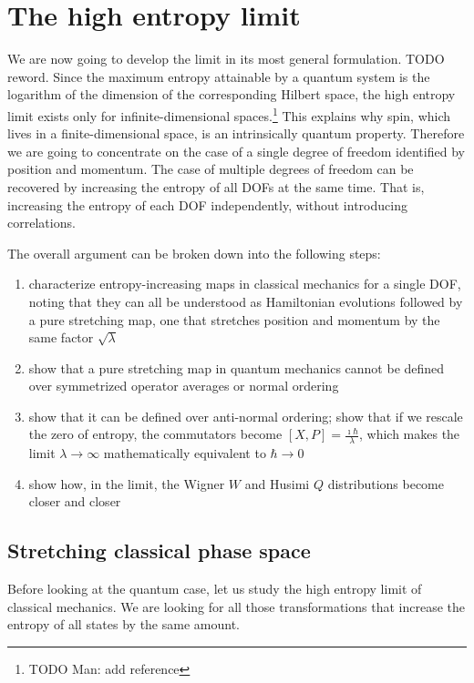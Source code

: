 \documentclass{article}
\begin{document}
\section{The high entropy limit}

We are now going to develop the limit in its most general formulation. TODO reword. Since the maximum entropy attainable by a quantum system is the logarithm of the dimension of the corresponding Hilbert space, the high entropy limit exists only for infinite-dimensional spaces.\footnote{TODO Man: add reference} This explains why spin, which lives in a finite-dimensional space, is an intrinsically quantum property. Therefore we are going to concentrate on the case of a single degree of freedom identified by position and momentum. The case of multiple degrees of freedom can be recovered by increasing the entropy of all DOFs at the same time. That is, increasing the entropy of each DOF independently, without introducing correlations.

The overall argument can be broken down into the following steps:
\begin{enumerate}
    \item characterize entropy-increasing maps in classical mechanics for a single DOF, noting that they can all be understood as Hamiltonian evolutions followed by a pure stretching map, one that stretches position and momentum by the same factor $\sqrt{\lambda}$
    \item show that a pure stretching map in quantum mechanics cannot be defined over symmetrized operator averages or normal ordering
    \item show that it can be defined over anti-normal ordering; show that if we rescale the zero of entropy, the commutators become $[X, P]= \frac{\imath \hbar}{\lambda}$, which makes the limit $\lambda \to \infty$ mathematically equivalent to $\hbar \to 0$
    \item show how, in the limit, the Wigner $W$ and Husimi $Q$ distributions become closer and closer
\end{enumerate}

\subsection{Stretching classical phase space}

Before looking at the quantum case, let us study the high entropy limit of classical mechanics. We are looking for all those transformations that increase the entropy of all states by the same amount.
\end{document}
